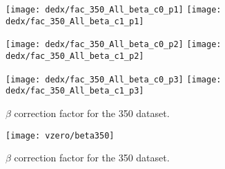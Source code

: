 \begin{figure}
  \centering
  \texttt{[image: dedx/fac\_350\_All\_beta\_c0\_p1]}
  \texttt{[image: dedx/fac\_350\_All\_beta\_c1\_p1]}

  \texttt{[image: dedx/fac\_350\_All\_beta\_c0\_p2]}
  \texttt{[image: dedx/fac\_350\_All\_beta\_c1\_p2]}

  \texttt{[image: dedx/fac\_350\_All\_beta\_c0\_p3]}
  \texttt{[image: dedx/fac\_350\_All\_beta\_c1\_p3]}

  \caption{$\beta$ correction factor for the 350 \GeVc dataset.}
  \label{fig:hadron:correction:beta:dedx350}
\end{figure}


\begin{figure}
  \centering
  \texttt{[image: vzero/beta350]}
  
  \caption{$\beta$ correction factor for the 350 \GeVc dataset.}
  \label{fig:hadron:correction:beta:vzero350}
\end{figure}

